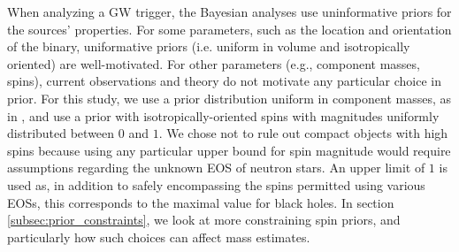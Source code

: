 When analyzing a GW trigger, the Bayesian analyses use uninformative priors for the sources' properties.  For some parameters, such as the location and orientation of the binary, uniformative priors (i.e. uniform in volume and isotropically oriented) are well-motivated.  For other parameters (e.g., component masses, spins), current observations and theory do not motivate any particular choice in prior.  For this study, we use a prior distribution uniform in component masses, as in \citet{2013arXiv1304.0670L}, and use a prior with isotropically-oriented spins with magnitudes uniformly distributed between $0$ and $1$.  We chose not to rule out compact objects with high spins because using any particular upper bound for spin magnitude would require assumptions regarding the unknown EOS of neutron stars. An upper limit of $1$ is used as, in addition to safely encompassing the spins permitted using various EOSs, this corresponds to the maximal value for black holes.  In section \ref{subsec:prior_constraints}, we look at more constraining spin priors, and particularly how such choices can affect mass estimates.